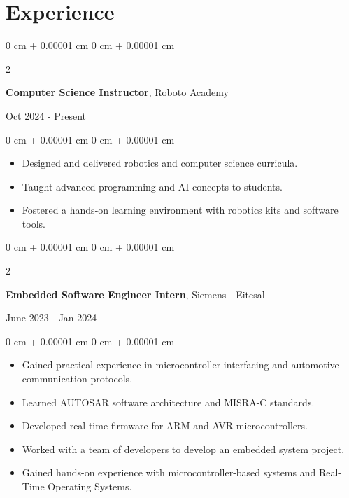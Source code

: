 \documentclass[10pt, letterpaper]{article}
\newenvironment{highlights}{
    \begin{itemize}[
        topsep=0.10 cm,
        parsep=0.10 cm,
        partopsep=0pt,
        itemsep=0pt,
        leftmargin=0 cm + 10pt
    ]
}{
    \end{itemize}
} %
\newenvironment{onecolentry}{
    \begin{adjustwidth}{
        0 cm + 0.00001 cm
    }{
        0 cm + 0.00001 cm
    }
}{
    \end{adjustwidth}
} %
\newenvironment{twocolentry}[2][]{
    \onecolentry
    \def\secondColumn{#2}
    \setcolumnwidth{\fill, 4.5 cm}
    \begin{paracol}{2}
}{
    \switchcolumn \raggedleft \secondColumn
    \end{paracol}
    \endonecolentry
} %
\begin{document}
        \section{Experience}
        
            \begin{twocolentry}{
                Oct 2024 - Present
            }
                \textbf{Computer Science Instructor}, Roboto Academy
            \end{twocolentry}

            \vspace{0.10 cm}
            \begin{onecolentry}
                \begin{highlights}
                    
                    \item Designed and delivered robotics and computer science curricula.
                    \item Taught advanced programming and AI concepts to students.
                    \item Fostered a hands-on learning environment with robotics kits and software tools.
                \end{highlights}
            \end{onecolentry}
            
            \begin{twocolentry}{
                June 2023 - Jan 2024
            }
                \textbf{Embedded Software Engineer Intern}, Siemens - Eitesal
            \end{twocolentry}

            \vspace{0.10 cm}
            \begin{onecolentry}
                \begin{highlights}
                    
                    \item Gained practical experience in microcontroller interfacing and automotive communication protocols.
                    \item Learned AUTOSAR software architecture and MISRA-C standards.
                    \item Developed real-time firmware for ARM and AVR microcontrollers.
                    \item Worked with a team of developers to develop an embedded system project.
                    \item Gained hands-on experience with microcontroller-based systems and Real-Time Operating Systems.
                \end{highlights}
            \end{onecolentry}
            
\end{document}
